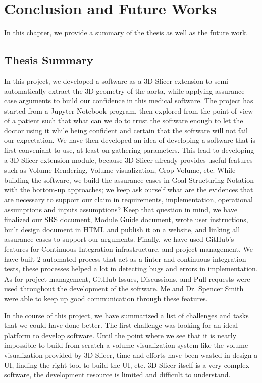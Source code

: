 \chapter{Conclusion and Future Works}

In this chapter, we provide a summary of the thesis as well as the future work.

\section{Thesis Summary}

In this project, we developed a software as a 3D Slicer extension to semi-automatically extract the 3D geometry of the aorta, while applying assurance case arguments to build our confidence in this medical software. The project has started from a Jupyter Notebook program, then explored from the point of view of a patient such that what can we do to trust the software enough to let the doctor using it while being confident and certain that the software will not fail our expectation. We have then developed an idea of developing a software that is first conveniant to use, at least on gathering parameters. This lead to developing a 3D Slicer extension module, because 3D Slicer already provides useful features such as Volume Rendering, Volume visualization, Crop Volume, etc. While building the software, we build the assurance cases in Goal Structuring Notation with the bottom-up approaches; we keep ask ourself what are the evidences that are necessary to support our claim in requirements, implementation, operational assumptions and inputs assumptions? Keep that question in mind, we have finalized our SRS document, Module Guide document, wrote user instructions, built design document in HTML and publish it on a website, and linking all assurance cases to support our arguments. Finally, we have used GitHub's features for Continuous Integration infrastructure, and project management. We have built 2 automated process that act as a linter and continuous integration tests, these processes helped a lot in detecting bugs and errors in implementation. As for project management, GitHub Issues, Discussions, and Pull requests were used throughout the development of the software. Me and Dr. Spencer Smith were able to keep up good communication through these features.

In the course of this project, we have summarized a list of challenges and tasks that we could have done better. The first challenge was looking for an ideal platform to develop \progname{} software. Until the point where we see that it is nearly impossible to build from scratch a volume visualization system like the volume visualization provided by 3D Slicer, time and efforts have been wasted in design a UI, finding the right tool to build the UI, etc. 3D Slicer itself is a very complex software, the development resource is limited and difficult to understand.

